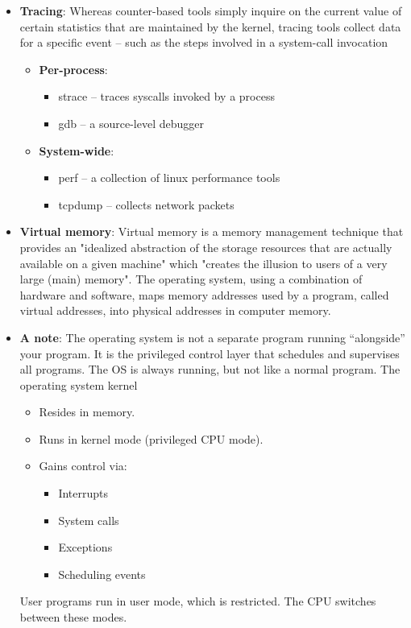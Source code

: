 \documentclass{report}
\begin{document}
\begin{itemize}
        \item \textbf{Tracing}: Whereas counter-based tools simply inquire on the current value of certain statistics that are maintained by the kernel, tracing tools collect data for a specific event – such as the steps involved in a system-call invocation
            \begin{itemize}
                \item \textbf{Per-process}:
                \begin{itemize}
                    \item strace – traces syscalls invoked by a process
                    \item gdb – a source-level debugger
                \end{itemize}
                \item \textbf{System-wide}:
                    \begin{itemize}
                        \item perf – a collection of linux performance tools
                        \item tcpdump – collects network packets
                    \end{itemize}
            \end{itemize}
        \item \textbf{Virtual memory}: Virtual memory is a memory management technique that provides an "idealized abstraction of the storage resources that are actually available on a given machine" which "creates the illusion to users of a very large (main) memory".
            \bigbreak \noindent 
            The operating system, using a combination of hardware and software, maps memory addresses used by a program, called virtual addresses, into physical addresses in computer memory.
        \item \textbf{A note}: The operating system is not a separate program running “alongside” your program. It is the privileged control layer that schedules and supervises all programs.
            \bigbreak \noindent 
            The OS is always running, but not like a normal program. The operating system kernel
            \begin{itemize}
                \item Resides in memory.
                \item Runs in kernel mode (privileged CPU mode).
                \item Gains control via:
                    \begin{itemize}
                        \item Interrupts
                        \item System calls
                        \item Exceptions
                        \item Scheduling events
                \end{itemize}
            \end{itemize}
            User programs run in user mode, which is restricted. The CPU switches between these modes.

    \end{itemize}
\end{document}
